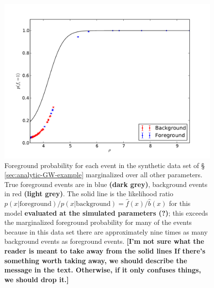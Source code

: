 \documentclass[aps,prd]{revtex4-1}
\newcommand{\ilya}[1]{{\color{red} \bf #1}}
\begin{document}
\begin{figure}
  \includegraphics[width=\columnwidth]{pfore}
  \caption{\label{fig:analytic-rate-foreground-probs} Foreground
    probability for each event in the synthetic data set of \S
    \ref{sec:analytic-GW-example} marginalized over all other
    parameters.  True foreground events are in blue \ilya{(dark
      grey)}, background events in red \ilya{(light grey)}.  The solid
    line is the likelihood ratio
    $p(x|\mathrm{foreground})/p(x|\mathrm{background}) =
    \hat{f}(x)/\hat{b}(x)$ for this model \ilya{evaluated at the
      simulated parameters (?)}; this exceeds the marginalized
    foreground probability for many of the events because in this data
    set there are approximately nine times as many background events
    as foreground events. \ilya{[I'm not sure what the reader is meant
        to take away from the solid lines If there's something worth
        taking away, we should describe the message in the text.
        Otherwise, if it only confuses things, we should drop it.]}}
\end{figure}
\end{document}
